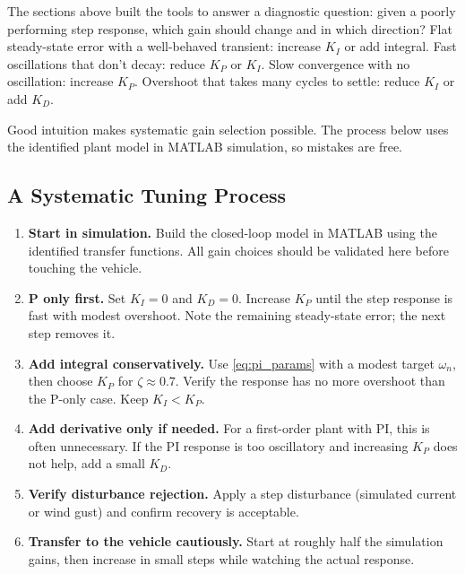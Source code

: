\documentclass[12pt]{article}
\begin{document}
The sections above built the tools to answer a diagnostic question: given a
poorly performing step response, which gain should change and in which
direction?  Flat steady-state error with a well-behaved transient: increase
$K_I$ or add integral.  Fast oscillations that don't decay: reduce $K_P$ or
$K_I$.  Slow convergence with no oscillation: increase $K_P$.  Overshoot that
takes many cycles to settle: reduce $K_I$ or add $K_D$.

Good intuition makes systematic gain selection possible.  The process below
uses the identified plant model in MATLAB simulation, so mistakes are free.
  
\subsection{A Systematic Tuning Process}

\begin{enumerate}
  \item \textbf{Start in simulation.}  Build the closed-loop model in MATLAB
    using the identified transfer functions.  All gain
    choices should be validated here before touching the vehicle.

  \item \textbf{P only first.}  Set $K_I = 0$ and $K_D = 0$.  Increase
    $K_P$ until the step response is fast with modest overshoot.  Note the
    remaining steady-state error; the next step removes it.

  \item \textbf{Add integral conservatively.}  Use \cref{eq:pi_params} with
    a modest target $\omega_n$, then choose $K_P$ for $\zeta \approx 0.7$.
    Verify the response has no more overshoot than the P-only case.
    Keep $K_I < K_P$.

  \item \textbf{Add derivative only if needed.}  For a first-order plant
    with PI, this is often unnecessary.  If the PI response is too
    oscillatory and increasing $K_P$ does not help, add a small $K_D$.

  \item \textbf{Verify disturbance rejection.}  Apply a step disturbance
    (simulated current or wind gust) and confirm recovery is acceptable.

  \item \textbf{Transfer to the vehicle cautiously.}  Start at roughly half
    the simulation gains, then increase in small steps while watching the
    actual response.
\end{enumerate}
\end{document}
